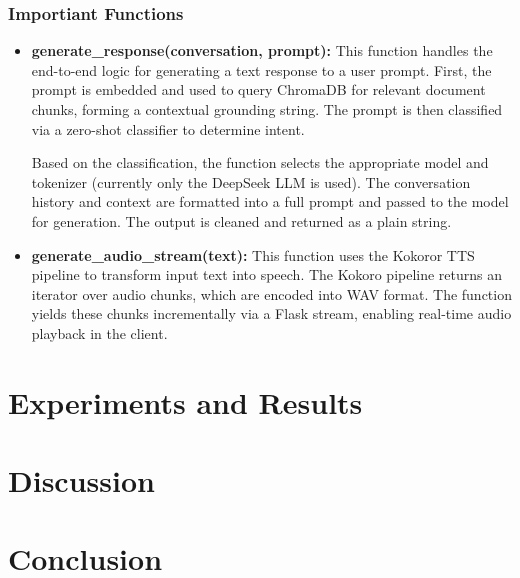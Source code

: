 \documentclass[twocolumn]{article}
\begin{document}
\subsubsection{Importiant Functions}
\label{sec:functions}
\begin{itemize}
    \item \textbf{generate\_response(conversation, prompt):} This function handles the end-to-end logic for generating a text response to a user prompt. First, the prompt is embedded and used to query ChromaDB for relevant document chunks, forming a contextual grounding string. The prompt is then classified via a zero-shot classifier to determine intent.

    Based on the classification, the function selects the appropriate model and tokenizer (currently only the DeepSeek LLM is used). The conversation history and context are formatted into a full prompt and passed to the model for generation. The output is cleaned and returned as a plain string.
    \item \textbf{generate\_audio\_stream(text):} This function uses the Kokoror TTS pipeline to transform input text into speech. The Kokoro pipeline returns an iterator over audio chunks, which are encoded into WAV format. The function yields these chunks incrementally via a Flask stream, enabling real-time audio playback in the client.
\end{itemize}

\section{Experiments and Results}

\section{Discussion}

\section{Conclusion}


\subsubsection{}


\end{document}
